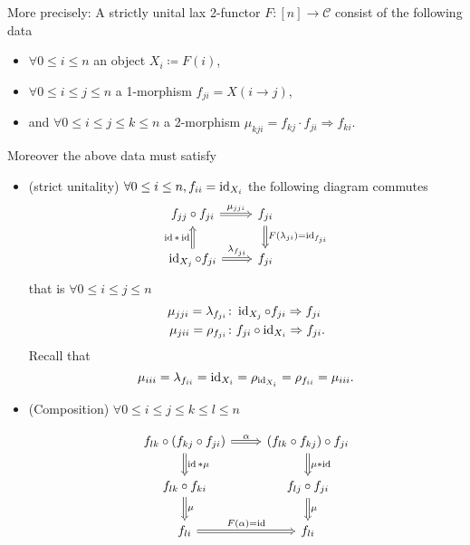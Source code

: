 \begin{rmk}
\begin{itemize}
	\end{itemize} 

	More precisely:
	A strictly unital lax 2-functor $ F \colon [ n ] \to \mathcal{ C } $ consist of the following data
	\begin{itemize}
		\item 	
		 $ \forall 0 \leq i \leq n $ an object $ X_i \coloneqq F ( i ) $,
		
		\item   
		$ \forall 0 \leq i \leq j \leq n $ a 1-morphism $ f_{ j i } = X ( i \to j ) $,
		
		\item 
		and $ \forall 0 \leq i \leq j \leq k \leq n $ a 2-morphism $ \mu_{ k j i } = f_{ k j } \cdot f_{ j i } \Rightarrow f_{ k i } $.
	\end{itemize}

	Moreover the above data must satisfy
	
	\begin{itemize}
		\item 
		(strict unitality) $ \forall 0 \leq i \leq n , f_{ i i } = \operatorname{id}_{ X_i } $ the following diagram commutes
		\[
		\begin{tikzcd}
			f_{ j j } \circ f_{ j i }
			\ar[r, Rightarrow, "\mu_{ j j i }"]
			&
			f_{ j i }
			\ar[d, Rightarrow, " F ( \lambda_{ j i } ) = \id_{ f_{ j i } }"]
			\\
			\id_{ X_j } \circ f_{ j i }
			\ar[u, Rightarrow, "\id * \id"]
			\ar[r, Rightarrow, "\lambda_{ f_{ ji } } "]
			&
			f_{ j i }
		\end{tikzcd}
		\]
		that is $ \forall 0 \leq i \leq j \leq n $ 
		\begin{align*}
			\mu_{ j j i } = \lambda_{ f_{ j i } } 
			&\colon
			\operatorname{id}_{ X_j } \circ f_{ j i } \Rightarrow f_{ j i }
			\\
			\mu_{ j i i } = \rho_{ f_{ j i } } 
			&\colon 
			f_{ j i } \circ \operatorname{id}_{ X_i } \Rightarrow f_{ j i }.
		\end{align*}
		Recall that 
		\[
			\mu_{ i i i } = \lambda_{ f_{ i i } } = \operatorname{id}_{ X_i } = \rho_{ \operatorname{id}_ { X_i } } = \rho_{ f_{ i i } } = \mu_{ i i i }.
		\] 
		
		\item 
		(Composition)
		$ \forall 0 \leq i \leq j \leq k \leq l \leq n $
		
		\begin{equation}
		\label{eq:1}
		\begin{tikzcd}
			f_{lk} \circ ( f_{kj} \circ f_{ji} )
			\ar[r, Rightarrow, "\alpha"]
			\ar[d, Rightarrow, " \id * \mu"]
			&
			( f_{lk} \circ f_{kj} ) \circ f_{ji}
			\ar[d, Rightarrow, "\mu*\id"]
			\\
			f_{lk} \circ f_{ki}
			\ar[d, Rightarrow," \mu "]
			&
			f_{lj} \circ f_{ji}
			\ar[d, Rightarrow, " \mu "]
			\\
			f_{li}
			\ar[r, Rightarrow, " F ( \alpha ) = \id "]
			&
			f_{li}
		\end{tikzcd}
		\end{equation}
	\end{itemize}
\end{rmk}

